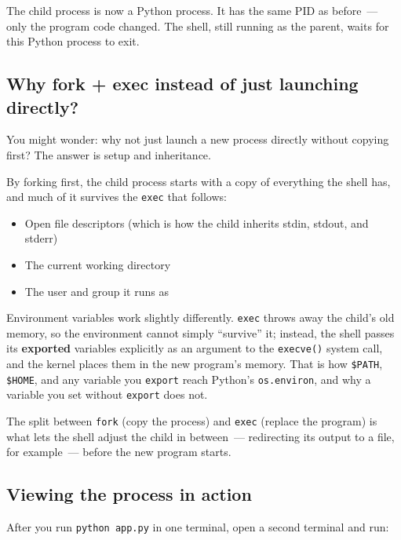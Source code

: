 \noindent{}The child process is now a Python process. It has the same PID as before~--- only the program code changed. The shell, still running as the parent, waits for this Python process to exit.

\subsection*{Why fork + exec instead of just launching directly?}\label{01-command-to-process:why-fork--exec-instead-of-just-launching-directly}

You might wonder: why not just launch a new process directly without copying first? The answer is setup and inheritance.

By forking first, the child process starts with a copy of everything the shell has, and much of it survives the \texttt{exec} that follows:

\begin{itemize}
\tightlist
\item
  Open file descriptors (which is how the child inherits stdin, stdout, and stderr)
\item
  The current working directory
\item
  The user and group it runs as
\end{itemize}

\noindent{}Environment variables work slightly differently. \texttt{exec} throws away the child's old memory, so the environment cannot simply ``survive'' it; instead, the shell passes its \textbf{exported} variables explicitly as an argument to the \texttt{execve()} system call, and the kernel places them in the new program's memory. That is how \texttt{\$PATH}, \texttt{\$HOME}, and any variable you \texttt{export} reach Python's \texttt{os.environ}, and why a variable you set without \texttt{export} does not.

The split between \texttt{fork} (copy the process) and \texttt{exec} (replace the program) is what lets the shell adjust the child in between~--- redirecting its output to a file, for example~--- before the new program starts.

\subsection*{Viewing the process in action}\label{01-command-to-process:viewing-the-process-in-action}

After you run \texttt{python\ app.py} in one terminal, open a second terminal and run:

